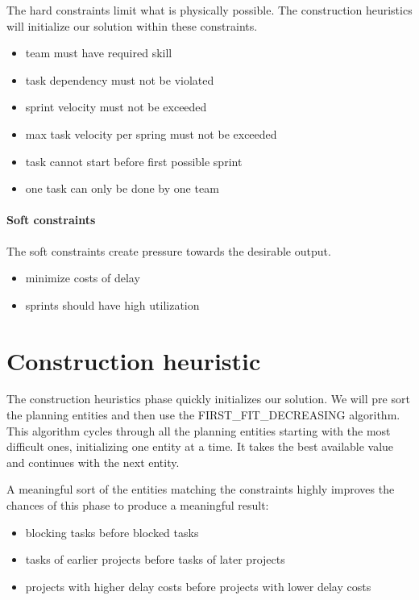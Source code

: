 \documentclass[10pt,a4paper]{article}
\begin{document}
The hard constraints limit what is physically possible. The construction heuristics will initialize our solution within these constraints.

\begin{itemize}
\item team must have required skill
\item task dependency must not be violated
\item sprint velocity must not be exceeded
\item max task velocity per spring must not be exceeded
\item task cannot start before first possible sprint
\item one task can only be done by one team
\end{itemize}

\paragraph{Soft constraints}

The soft constraints create pressure towards the desirable output.

\begin{itemize}
\item minimize costs of delay
\item sprints should have high utilization
\end{itemize}

\section{Construction heuristic}

The construction heuristics phase quickly initializes our solution. We will pre sort the planning entities and then use the FIRST\_FIT\_DECREASING algorithm. This algorithm cycles through all the planning entities starting with the most difficult ones, initializing one entity at a time. It takes the best available value and continues with the next entity.

A meaningful sort of the entities matching the constraints highly improves the chances of this phase to produce a meaningful result:

\begin{itemize}
\item blocking tasks before blocked tasks
\item tasks of earlier projects before tasks of later projects
\item projects with higher delay costs before projects with lower delay costs
\end{itemize}
\end{document}

